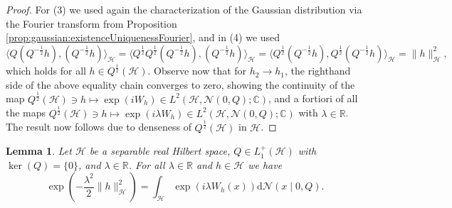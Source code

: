 \documentclass[letterpaper]{article} %
\newcommand{\R}{\mathbb{R}}
\newcommand{\hs}[1]{\mathcal{#1}} %
\newcommand{\Normal}{\mathcal{N}}
\newcommand{\C}{\mathbb{C}}
\newcommand{\stpx}[1]{{(#1)}}
\newtheorem{lemma}[theorem]{Lemma}
\begin{document}
\begin{proof}
For \stpx{3} we used again the characterization of the Gaussian distribution via the Fourier transform from Proposition \ref{prop:gaussian:existenceUniquenessFourier},
and in \stpx{4} we used
\begin{equation*}
    \langle Q(Q^{-\frac12}h),(Q^{-\frac12}h)\rangle_\hs{H}
    = \langle Q^\frac12Q^\frac12(Q^{-\frac12}h),(Q^{-\frac12}h)\rangle_\hs{H}
    = \langle Q^\frac12(Q^{-\frac12}h), Q^\frac12(Q^{-\frac12}h) \rangle_\hs{H}
    = \|h\|_\hs{H}^2,
\end{equation*}
which holds for all $h\in Q^{\frac12}(\hs{H})$.
Observe now that for $h_2\rightarrow h_1$, the righthand side of the above equality chain converges to zero, showing the continuity of the map 
$Q^{\frac12}(\hs{H})\ni h \mapsto \exp(i W_h) \in L^2(\hs{H},\Normal(0,Q);\C)$,
and a fortiori of all the maps
$Q^{\frac12}(\hs{H})\ni h \mapsto \exp(i \lambda W_h) \in L^2(\hs{H},\Normal(0,Q);\C)$
with $\lambda\in\R$.
The result now follows due to denseness of $Q^\frac12(\hs{H})$ in $\hs{H}$.
\end{proof}
\begin{lemma} \label{lem:distrslt:expressionForGaussianKernelFunction}
    Let $\hs{H}$ be a separable real Hilbert space, $Q\in L_1^+(\hs{H})$ with $\ker(Q)=\{0\}$, and $\lambda\in\R$.
    For all $\lambda\in\R$ and $h\in\hs{H}$ we have
    \begin{equation} \label{eq:expRepresentationWNM}
        \exp\left(-\frac{\lambda^2}{2}\|h\|_\hs{H}^2\right) = \int_\hs{H} \exp(i\lambda W_h(x))\mathrm{d}\Normal(x\mid 0, Q).
   \end{equation}
\end{lemma}
\end{document}
